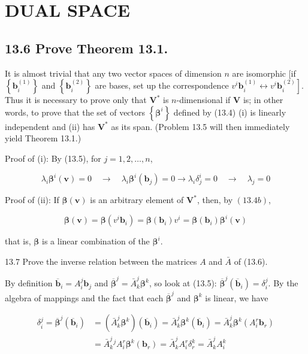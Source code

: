 \documentclass[10pt]{article}
\begin{document}
\section*{DUAL SPACE}
\subsection*{13.6 Prove Theorem 13.1.}
It is almost trivial that any two vector spaces of dimension $n$ are isomorphic [if $\left\{\mathbf{b}_{i}^{(1)}\right\}$ and $\left\{\mathbf{b}_{i}^{(2)}\right\}$ are bases, set up the correspondence $\left.v^{i} \mathbf{b}_{i}^{(1)} \leftrightarrow v^{i} \mathbf{b}_{i}^{(2)}\right]$. Thus it is necessary to prove only that $\mathbf{V}^{*}$ is $n$-dimensional if $\mathbf{V}$ is; in other words, to prove that the set of vectors $\left\{\boldsymbol{\beta}^{i}\right\}$ defined by (13.4) (i) is linearly independent and (ii) has $\mathbf{V}^{*}$ as its span. (Problem 13.5 will then immediately yield Theorem 13.1.)

Proof of (i): By (13.5), for $j=1,2, \ldots, n$,

$$
\lambda_{i} \boldsymbol{\beta}^{i}(\mathbf{v})=0 \quad \rightarrow \quad \lambda_{i} \boldsymbol{\beta}^{i}\left(\mathbf{b}_{j}\right)=0 \rightarrow \lambda_{i} \delta_{j}^{i}=0 \quad \rightarrow \quad \lambda_{j}=0
$$

Proof of (ii): If $\boldsymbol{\beta}(\mathbf{v})$ is an arbitrary element of $\mathbf{V}^{*}$, then, by $(13.4 b)$,

$$
\boldsymbol{\beta}(\mathbf{v})=\boldsymbol{\beta}\left(v^{i} \mathbf{b}_{i}\right)=\boldsymbol{\beta}\left(\mathbf{b}_{i}\right) v^{i}=\boldsymbol{\beta}\left(\mathbf{b}_{i}\right) \boldsymbol{\beta}^{i}(\mathbf{v})
$$

that is, $\boldsymbol{\beta}$ is a linear combination of the $\boldsymbol{\beta}^{i}$.

13.7 Prove the inverse relation between the matrices $A$ and $\bar{A}$ of (13.6).

By definition $\overline{\mathbf{b}}_{i}=A_{i}^{j} \mathbf{b}_{j}$ and $\overline{\boldsymbol{\beta}}^{j}=\bar{A}_{k}^{j} \boldsymbol{\beta}^{k}$, so look at (13.5): $\overline{\boldsymbol{\beta}}^{j}\left(\overline{\mathbf{b}}_{i}\right)=\delta_{i}^{j}$. By the algebra of mappings and the fact that each $\overline{\boldsymbol{\beta}}^{j}$ and $\boldsymbol{\beta}^{k}$ is linear, we have

$$
\begin{aligned}
\delta_{i}^{j}=\overline{\boldsymbol{\beta}}^{j}\left(\overline{\mathbf{b}}_{i}\right) & =\left(\bar{A}_{k}^{j} \boldsymbol{\beta}^{k}\right)\left(\overline{\mathbf{b}}_{i}\right)=\bar{A}_{k}^{j} \boldsymbol{\beta}^{k}\left(\overline{\mathbf{b}}_{i}\right)=\bar{A}_{k}^{j} \boldsymbol{\beta}^{k}\left(A_{i}^{r} \mathbf{b}_{r}\right) \\
& =\bar{A}_{k}^{j}{ }^{j} A_{i}^{r} \boldsymbol{\beta}^{k}\left(\mathbf{b}_{r}\right)=\bar{A}_{k}^{j} A_{i}^{r} \delta_{r}^{k}=\bar{A}_{k}^{j} A_{i}^{k}
\end{aligned}
$$
\end{document}
